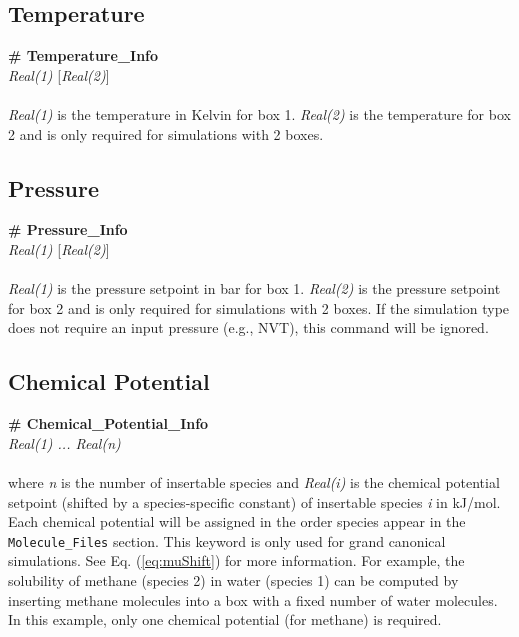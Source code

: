 \subsection{Temperature}\label{sec:Temperature_Info}
{\bf \# Temperature\_Info} \\ 
{\it Real(1)} [{\it Real(2)}] \\ \\
%
{\it Real(1)} is the temperature in Kelvin for box 1. 
{\it Real(2)} is the temperature for box 2 and is only required for simulations with 2 boxes.
%
%
\subsection{Pressure}\label{sec:Pressure_Info}
{\bf \# Pressure\_Info} \\
{\it Real(1)} [{\it Real(2)}] \\ \\
%
{\it Real(1)} is the pressure setpoint in bar for box 1.
{\it Real(2)} is the pressure setpoint for box 2 and is only required for simulations with 2 boxes. 
If the simulation type does not require an input pressure (e.g., NVT), this command will be ignored.  
%
%
\subsection{Chemical Potential}\label{sec:Chemical_Potential}
{\bf \# Chemical\_Potential\_Info} \\
{\it Real(1) ... Real(n)} \\ \\
%
where {\it n} is the number of insertable species and {\it Real(i)} is the 
chemical potential setpoint (shifted by a species-specific constant) of 
insertable species {\it i} in kJ/mol. Each chemical potential will be assigned 
in the order species appear in the \texttt{Molecule\_Files} section. 
This keyword is only used for grand canonical simulations.
See Eq. (\ref{eq:muShift}) for more information. 
For example, the solubility
of methane (species 2) in water (species 1) can be computed by inserting
methane molecules into a box with a fixed number of water molecules. 
In this example, only one chemical potential (for methane) is required.

